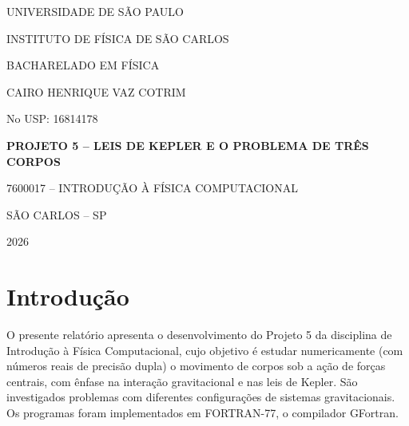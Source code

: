\documentclass[12pt,a4paper]{article}
\begin{document}

\begin{titlepage}

\begin{center}

{\large
UNIVERSIDADE DE SÃO PAULO
}

\vspace{0.3cm}

{\large
INSTITUTO DE FÍSICA DE SÃO CARLOS
}

\vspace{0.3cm}

{\large
BACHARELADO EM FÍSICA
}

\vfill

{\large
CAIRO HENRIQUE VAZ COTRIM
}

\vspace{0.3cm}

{\large
No USP: 16814178
}

\vfill

{\large\bfseries
PROJETO 5 -- LEIS DE KEPLER E O PROBLEMA DE TRÊS CORPOS
}

\vspace{0.5cm}

{\normalsize
7600017 -- INTRODUÇÃO À FÍSICA COMPUTACIONAL
}

\vfill

{\large
SÃO CARLOS -- SP
}

\vspace{0.3cm}

{\large
2026
}

\end{center}

\end{titlepage}



\tableofcontents
\newpage



\section*{Introdução}

O presente relatório apresenta o desenvolvimento do Projeto 5 da disciplina de Introdução à Física Computacional, cujo objetivo é estudar numericamente (com números reais de precisão dupla) o movimento de corpos sob a ação de forças centrais, com ênfase na interação gravitacional e nas leis de Kepler. São investigados problemas com diferentes configurações de sistemas gravitacionais. Os programas foram implementados em FORTRAN-77, o compilador GFortran.
\end{document}
